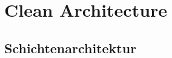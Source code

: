 \chapter{Clean Architecture}
\label{chapter:clean_architecture}

\section{Schichtenarchitektur}
\label{section:schichtenarchitektur}

